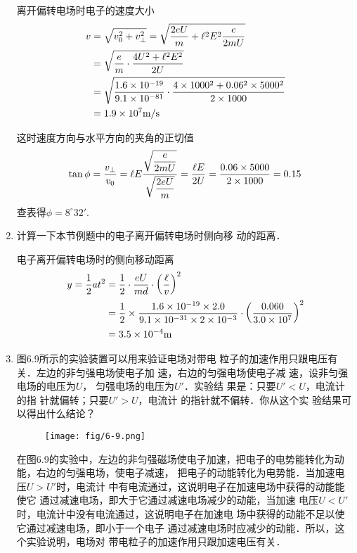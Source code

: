 \begin{enumerate}
\begin{solution}
    离开偏转电场时电子的速度大小
   \[\begin{split}
      v&=\sqrt{v^2_0+v^2_{\bot}}=\sqrt{\frac{2eU}{m}+\ell^2E^2\frac{e}{2mU}}\\
&=\sqrt{\frac{e}{m}\cdot \frac{4U^2+\ell^2E^2}{2U}}\\
&=\sqrt{\frac{1.6\times 10^{-19}}{9.1\times 10^{-81}}\cdot \frac{4\times 1000^2+0.06^2\times 5000^2}{2\times 1000}}\\
&=1.9\times 10^7\text{m}/\text{s}
   \end{split}\]

    这时速度方向与水平方向的夹角的正切值
    \[\tan\phi=\frac{v_{\bot}}{v_0}=\ell E\frac{\sqrt{\dfrac{e}{2mU}}}{\sqrt{\dfrac{2eU}{m}}}=\frac{\ell E}{2U}=\frac{0.06\times 5000}{2\times 1000}=0.15 \]
    查表得$\phi=8^{\circ}32'$.
\end{solution}

\item 计算一下本节例题中的电子离开偏转电场时侧向移
动的距离．

\begin{solution}
    电子离开偏转电场时的侧向移动距离
    \[\begin{split}
 y=\frac{1}{2}at^2 &=\frac{1}{2}\cdot \frac{eU}{md}\cdot \left(\frac{\ell }{v}\right)^2\\
 &=\frac{1}{2}\times \frac{1.6\times 10^{-19}\times 2.0}{9.1\times 10^{-31}\times 2\times 10^{-3}}\cdot \left(\frac{0.060}{3.0\times 10^7}\right)^2\\
 &=3.5\times 10^{-4}{\rm m}      
    \end{split}\]
\end{solution}

\item 图6.9所示的实验装置可以用来验证电场对带电
粒子的加速作用只跟电压有关．左边的非匀强电场使电子加
速，右边的匀强电场使电子减
速，设非匀强电场的电压为$U$，
匀强电场的电压为$U'$．实验结
果是：只要$U'<U$，电流计的指
针就偏转；只要$U'>U$，电流计
的指针就不偏转．你从这个实
验结果可以得出什么结论？
\begin{figure}[htp]\centering
	\texttt{[image: fig/6-9.png]}
	\caption{}
	\end{figure}

    \begin{solution}
        在图6.9的实验中，左边的非匀强磁场使电子加速，把电子的电势能转化为动能，右边的匀强电场，使电子减速，
        把电子的动能转化为电势能．当加速电压$U>U'$时，电流计
        中有电流通过，这说明电子在加速电场中获得的动能能使它
        通过减速电场，即大于它通过减速电场减少的动能，当加速
        电压$U<U'$时，电流计中没有电流通过，这说明电子在加速电
        场中获得的动能不足以使它通过减速电场，即小于一个电子
        通过减速电场时应减少的动能．所以，这个实验说明，电场对
        带电粒子的加速作用只跟加速电压有关．
    \end{solution}
    
\end{enumerate}



